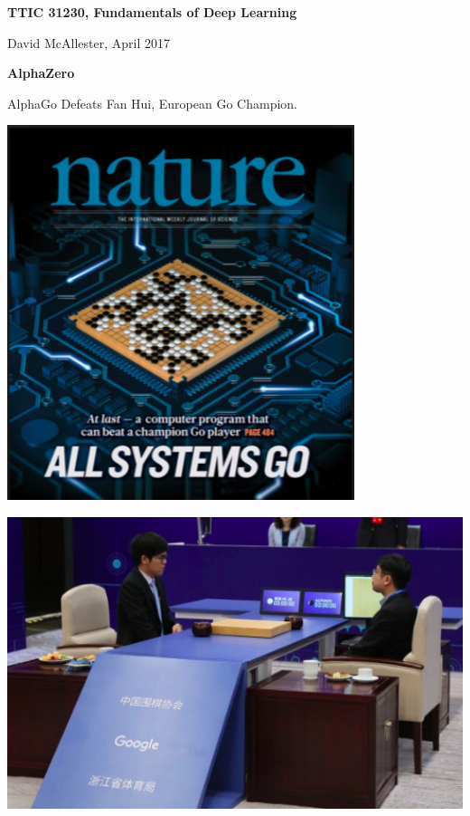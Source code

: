




{\Huge

  \centerline{\bf TTIC 31230, Fundamentals of Deep Learning}
  \bigskip
  \centerline{David McAllester, April 2017}


\vfill
\centerline{\bf AlphaZero}
\vfill
\vfill


AlphaGo Defeats Fan Hui, European Go Champion.

\vfill
\centerline{\includegraphics[width=4in]{../images/alphago}}


\vfill
\centerline{\includegraphics[width=8in]{../images/alphalee}}

}
